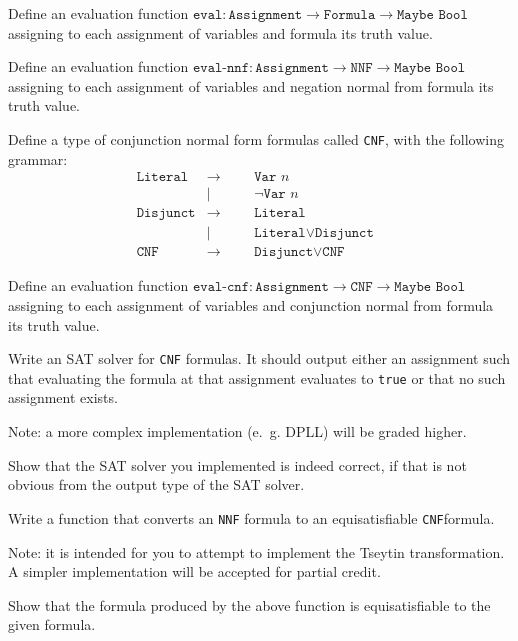 \documentclass{article}
\def\formula{\texttt{Formula}}
\def\nnf{\texttt{NNF}}
\def\cnf{\texttt{CNF}}
\def\var{\texttt{Var }}
\def\eval{\texttt{eval}}
\def\evalnnf{\texttt{eval-nnf}}
\def\evalcnf{\texttt{eval-cnf}}
\def\assignment{\texttt{Assignment}}
\def\bool{\texttt{Bool}}
\def\maybe{\texttt{Maybe }}
\def\lit{\texttt{Literal}}
\def\disj{\texttt{Disjunct}}
\begin{document}
\begin{problem}[*]
  Define an evaluation function \(\eval : \assignment → \formula → \maybe \bool\) assigning to each assignment of variables and formula its truth value.
\end{problem}

\begin{problem}[*]
  Define an evaluation function \(\evalnnf : \assignment → \nnf → \maybe \bool\) assigning to each assignment of variables and negation normal from formula its truth value.
\end{problem}

\begin{problem}[*]
  Define a type of conjunction normal form formulas called \cnf, with the following grammar:
  \begin{align*}
    &&&&&&&&&&&\lit  &→&&& \var n&&&&&&&&&&&&\\
    &&&&&&&&&&&      &|&&& ¬ \var n&&&&&&&&&&&&\\
    &&&&&&&&&&&\disj &→&&& \lit&&&&&&&&&&&&\\
    &&&&&&&&&&&      &|&&& \lit ∨ \disj&&&&&&&&&&&&\\
    &&&&&&&&&&&\cnf  &→&&& \disj ∨ \cnf&&&&&&&&&&&&
  \end{align*}
\end{problem}

\begin{problem}[*]
  Define an evaluation function \(\evalcnf : \assignment → \cnf → \maybe \bool\) assigning to each assignment of variables and conjunction normal from formula its truth value.
\end{problem}

\begin{problem}[**/***]
  Write an SAT solver for \cnf{} formulas. It should output either an assignment such that evaluating the formula at that assignment evaluates to \texttt{true} or that no such assignment exists.

  Note: a more complex implementation (e.~g. DPLL) will be graded higher.
\end{problem}

\begin{problem}[**]
  Show that the SAT solver you implemented is indeed correct, if that is not obvious from the output type of the SAT solver.
\end{problem}

\begin{problem}[**/***]
  Write a function that converts an \nnf{} formula to an equisatisfiable \cnf formula.

  Note: it is intended for you to attempt to implement the Tseytin transformation. A simpler implementation will be accepted for partial credit.
\end{problem}

\begin{problem}[****?]
  Show that the formula produced by the above function is equisatisfiable to the given formula.
\end{problem}
\end{document}
